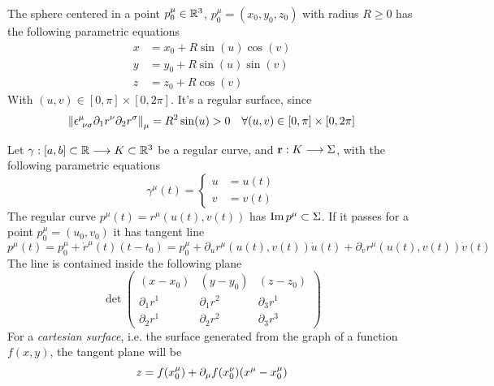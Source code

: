 \documentclass[../complete.tex]{subfiles}
\begin{document}
\begin{eg}
	The sphere centered in a point $p^\mu_0\in\mathbb{R}^3$, $p^\mu_0=(x_0,y_0,z_0)$ with radius $R\ge0$ has the following parametric equations
	\begin{equation}
		\begin{aligned}
			x&=x_0+R\sin(u)\cos(v)\\
			y&=y_0+R\sin(u)\sin(v)\\
			z&=z_0+R\cos(v)
		\end{aligned}
		\label{eq:sphereradiusR}
	\end{equation}
	With $(u,v)\in[0,\pi]\times[0,2\pi]$. It's a regular surface, since
	\begin{equation*}
		\norm{\epsilon^\mu_{\ \nu\sigma}\del_1r^\nu\del_2r^\sigma}_\mu=R^2\sin(u)>0\quad\forall(u,v)\in[0,\pi]\times[0,2\pi]
	\end{equation*}
\end{eg}
\begin{dfn}
	Let $\gamma:[a,b]\subset\mathbb{R}\overset{}{\longrightarrow} K\subset\mathbb{R}^3$ be a regular curve, and $\mathbf{r}:K\overset{}{\longrightarrow}\Sigma$, with the following parametric equations
	\begin{equation}
		\gamma^\mu(t)=\left\{\begin{aligned}u&=u(t)\\v&=v(t)\end{aligned}\right.
		\label{eq:parametricsurfgam}
	\end{equation}
	The regular curve $p^\mu(t)=r^\mu(u(t),v(t))$ has $\operatorname{Im}{p^\mu}\subset\Sigma$. If it passes for a point $p^\mu_0=(u_0,v_0)$ it has tangent line
	\begin{equation}
		p^\mu(t)=p^\mu_0+\dot{r}^{\mu}(t)(t-t_0)=p^\mu_0+\partial_ur^\mu(u(t),v(t))\dot{u}(t)+\partial_vr^\mu(u(t),v(t))\dot{v}(t)
		\label{eq:tangline}
	\end{equation}
	The line is contained inside the following plane
	\begin{equation}
		\det\begin{pmatrix}(x-x_0)&(y-y_0)&(z-z_0)\\\partial_1r^1&\partial_1r^2&\partial_3r^1\\\partial_2r^1&\partial_2r^2&\partial_3r^3\end{pmatrix}
		\label{eq:surftanlineplane}
	\end{equation}
	For a \textit{cartesian surface}, i.e. the surface generated from the graph of a function $f(x,y)$, the tangent plane will be
	\begin{equation}
		z=f(x^\mu_0)+\partial_\mu f(x^\nu_0)(x^\mu-x^\mu_0)
		\label{eq:cartsurftanplan}
	\end{equation}
\end{dfn}
\end{document}
